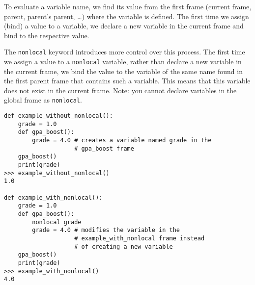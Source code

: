 To evaluate a variable name, we find its value from the first frame (current frame, parent, parent’s parent, …) where the variable is defined. The first time we assign (bind) a value to a variable, we declare a new variable in the current frame and bind to the respective value.

The \lstinline{nonlocal} keyword introduces more control over this process. The first time we assign a value to a \lstinline{nonlocal} variable, rather than declare a new variable in the current frame, we bind the value to the variable of the same name found in the first parent frame that contains such a variable. This means that this variable does not exist in the current frame. Note: you cannot declare variables in the global frame as \lstinline{nonlocal}.
\newline
\begin{lstlisting}
def example_without_nonlocal():
    grade = 1.0
    def gpa_boost():
        grade = 4.0 # creates a variable named grade in the
                    # gpa_boost frame
    gpa_boost()
    print(grade)
>>> example_without_nonlocal()
1.0

def example_with_nonlocal():
    grade = 1.0
    def gpa_boost():
        nonlocal grade
        grade = 4.0 # modifies the variable in the
                    # example_with_nonlocal frame instead
                    # of creating a new variable
    gpa_boost()
    print(grade)
>>> example_with_nonlocal()
4.0
\end{lstlisting}
